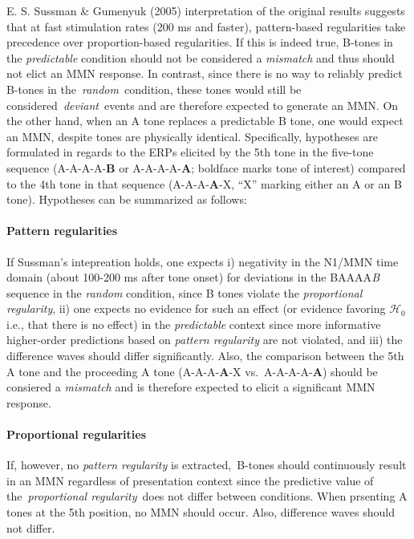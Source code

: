 \documentclass[twoside, man, a4paper,12pt, nofontenc]{apa7}
\begin{document}
E. S. Sussman \& Gumenyuk (2005) interpretation of the original results
suggests that at fast stimulation rates (200 ms and faster),
pattern-based regularities take precedence over proportion-based
regularities. If this is indeed true, B-tones in the \emph{predictable}
condition should not be considered a \emph{mismatch} and thus should not
elict an MMN response. In contrast, since there is no way to reliably
predict B-tones in the~\emph{random}~condition, these tones would still
be considered~\emph{deviant}~events and are therefore expected to
generate an MMN. On the other hand, when an A tone replaces a
predictable B tone, one would expect an MMN, despite tones are
physically identical. Specifically, hypotheses are formulated in regards
to the ERPs elicited by the 5th tone in the five-tone sequence
(A-A-A-A-\textbf{B} or A-A-A-A-\textbf{A}; boldface marks tone of
interest) compared to the 4th tone in that sequence (A-A-A-\textbf{A}-X,
\enquote{X} marking either an A or an B tone). Hypotheses can be
summarized as follows:

\hypertarget{pattern-regularities}{%
\paragraph{Pattern regularities}\label{pattern-regularities}}

If Sussman's intepreation holds, one expects i) negativity in the N1/MMN
time domain (about 100-200 ms after tone onset) for deviations in the
BAAAA\emph{B} sequence in the \emph{random} condition, since B tones
violate the \emph{proportional regularity}, ii) one expects no evidence
for such an effect (or evidence favoring \(\mathcal{H_0}\) i.e., that
there is no effect) in the \emph{predictable} context since more
informative higher-order predictions based on \emph{pattern regularity}
are not violated, and iii) the difference waves should differ
significantly. Also, the comparison between the 5th A tone and the
proceeding A tone (A-A-A-\textbf{A}-X vs.~A-A-A-A-\textbf{A}) should be
consiered a \emph{mismatch} and is therefore expected to elicit a
significant MMN response.

\hypertarget{proportional-regularities}{%
\paragraph{Proportional regularities}\label{proportional-regularities}}

If, however, no \emph{pattern regularity} is extracted,~B-tones should
continuously result in an MMN regardless of presentation context since
the predictive value of the~\emph{proportional regularity}~does not
differ between conditions. When prsenting A tones at the 5th position,
no MMN should occur. Also, difference waves should not differ.
\end{document}
